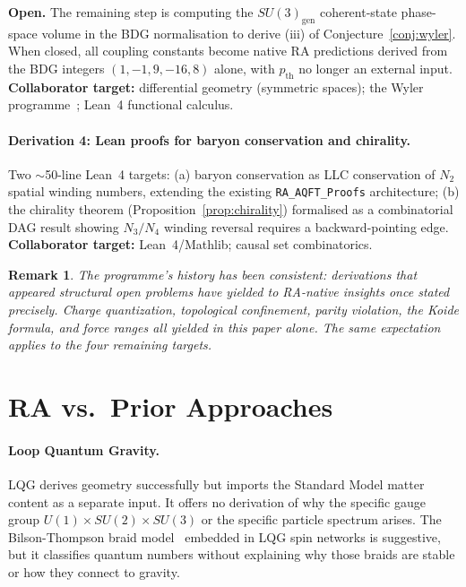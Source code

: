 \documentclass[11pt,a4paper]{article}
\newtheorem{remark}[theorem]{Remark}
\begin{document}
\textbf{Open.}
The remaining step is computing the $SU(3)_{\mathrm{gen}}$ coherent-state
phase-space volume in the BDG normalisation to derive (iii) of
Conjecture~\ref{conj:wyler}. When closed, all coupling constants become
native RA predictions derived from the BDG integers $(1,-1,9,-16,8)$ alone,
with $p_{\mathrm{th}}$ no longer an external input.
\textbf{Collaborator target:} differential geometry (symmetric spaces);
the Wyler programme~\citep{Wyler1969}; Lean~4 functional calculus.


\paragraph{Derivation 4: Lean proofs for baryon conservation and chirality.}
Two $\sim$50-line Lean~4 targets: (a) baryon conservation as LLC conservation
of $N_2$ spatial winding numbers, extending the existing
\texttt{RA\_AQFT\_Proofs} architecture; (b) the chirality theorem
(Proposition~\ref{prop:chirality}) formalised as a combinatorial DAG result
showing $N_3/N_4$ winding reversal requires a backward-pointing edge.
\textbf{Collaborator target:} Lean~4/Mathlib; causal set combinatorics.

\begin{remark}
The programme's history has been consistent: derivations that appeared
structural open problems have yielded to RA-native insights once stated
precisely. Charge quantization, topological confinement, parity violation,
the Koide formula, and force ranges all yielded in this paper alone. The
same expectation applies to the four remaining targets.
\end{remark}

\section{RA vs.\ Prior Approaches}
\label{sec:comparison}

\paragraph{Loop Quantum Gravity.} LQG derives geometry successfully but imports
the Standard Model matter content as a separate input. It offers no derivation
of why the specific gauge group $U(1) \times SU(2) \times SU(3)$ or the specific
particle spectrum arises. The Bilson-Thompson braid model~\citep{BilsonThompson2005}
embedded in LQG spin networks is suggestive, but it classifies quantum numbers
without explaining why those braids are stable or how they connect to gravity.
\end{document}
